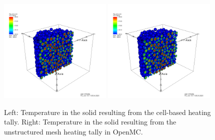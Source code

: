 \begin{figure}[htb!]
\centering
\includegraphics[clip=true,width=0.48\textwidth]{Figures/openmc_cell_temperature}
\includegraphics[clip=true,width=0.48\textwidth]{Figures/openmc_mesh_temperature}
\caption{Left: Temperature in the solid resulting from the cell-based heating tally. Right: Temperature in the solid resulting from the unstructured mesh heating tally in OpenMC.}
\label{f:1568_openmc_temperatures}
\end{figure}

